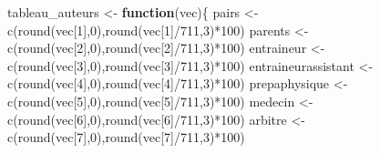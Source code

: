 \documentclass[
]{article}
\newenvironment{Shaded}{\begin{snugshade}}{\end{snugshade}}
\newcommand{\ControlFlowTok}[1]{\textcolor[rgb]{0.13,0.29,0.53}{\textbf{#1}}}
\newcommand{\DecValTok}[1]{\textcolor[rgb]{0.00,0.00,0.81}{#1}}
\newcommand{\FunctionTok}[1]{\textcolor[rgb]{0.00,0.00,0.00}{#1}}
\newcommand{\NormalTok}[1]{#1}
\newcommand{\OtherTok}[1]{\textcolor[rgb]{0.56,0.35,0.01}{#1}}
\newcommand{\SpecialCharTok}[1]{\textcolor[rgb]{0.00,0.00,0.00}{#1}}
\begin{document}
\begin{Shaded}
\begin{Highlighting}[]
\NormalTok{tableau\_auteurs }\OtherTok{\textless{}{-}} \ControlFlowTok{function}\NormalTok{(vec)\{}
\NormalTok{  pairs               }\OtherTok{\textless{}{-}} \FunctionTok{c}\NormalTok{(}\FunctionTok{round}\NormalTok{(vec[}\DecValTok{1}\NormalTok{],}\DecValTok{0}\NormalTok{),}\FunctionTok{round}\NormalTok{(vec[}\DecValTok{1}\NormalTok{]}\SpecialCharTok{/}\DecValTok{711}\NormalTok{,}\DecValTok{3}\NormalTok{)}\SpecialCharTok{*}\DecValTok{100}\NormalTok{)}
\NormalTok{  parents             }\OtherTok{\textless{}{-}} \FunctionTok{c}\NormalTok{(}\FunctionTok{round}\NormalTok{(vec[}\DecValTok{2}\NormalTok{],}\DecValTok{0}\NormalTok{),}\FunctionTok{round}\NormalTok{(vec[}\DecValTok{2}\NormalTok{]}\SpecialCharTok{/}\DecValTok{711}\NormalTok{,}\DecValTok{3}\NormalTok{)}\SpecialCharTok{*}\DecValTok{100}\NormalTok{)}
\NormalTok{  entraineur          }\OtherTok{\textless{}{-}} \FunctionTok{c}\NormalTok{(}\FunctionTok{round}\NormalTok{(vec[}\DecValTok{3}\NormalTok{],}\DecValTok{0}\NormalTok{),}\FunctionTok{round}\NormalTok{(vec[}\DecValTok{3}\NormalTok{]}\SpecialCharTok{/}\DecValTok{711}\NormalTok{,}\DecValTok{3}\NormalTok{)}\SpecialCharTok{*}\DecValTok{100}\NormalTok{)}
\NormalTok{  entraineurassistant }\OtherTok{\textless{}{-}} \FunctionTok{c}\NormalTok{(}\FunctionTok{round}\NormalTok{(vec[}\DecValTok{4}\NormalTok{],}\DecValTok{0}\NormalTok{),}\FunctionTok{round}\NormalTok{(vec[}\DecValTok{4}\NormalTok{]}\SpecialCharTok{/}\DecValTok{711}\NormalTok{,}\DecValTok{3}\NormalTok{)}\SpecialCharTok{*}\DecValTok{100}\NormalTok{)}
\NormalTok{  prepaphysique       }\OtherTok{\textless{}{-}} \FunctionTok{c}\NormalTok{(}\FunctionTok{round}\NormalTok{(vec[}\DecValTok{5}\NormalTok{],}\DecValTok{0}\NormalTok{),}\FunctionTok{round}\NormalTok{(vec[}\DecValTok{5}\NormalTok{]}\SpecialCharTok{/}\DecValTok{711}\NormalTok{,}\DecValTok{3}\NormalTok{)}\SpecialCharTok{*}\DecValTok{100}\NormalTok{)}
\NormalTok{  medecin             }\OtherTok{\textless{}{-}} \FunctionTok{c}\NormalTok{(}\FunctionTok{round}\NormalTok{(vec[}\DecValTok{6}\NormalTok{],}\DecValTok{0}\NormalTok{),}\FunctionTok{round}\NormalTok{(vec[}\DecValTok{6}\NormalTok{]}\SpecialCharTok{/}\DecValTok{711}\NormalTok{,}\DecValTok{3}\NormalTok{)}\SpecialCharTok{*}\DecValTok{100}\NormalTok{)}
\NormalTok{  arbitre             }\OtherTok{\textless{}{-}} \FunctionTok{c}\NormalTok{(}\FunctionTok{round}\NormalTok{(vec[}\DecValTok{7}\NormalTok{],}\DecValTok{0}\NormalTok{),}\FunctionTok{round}\NormalTok{(vec[}\DecValTok{7}\NormalTok{]}\SpecialCharTok{/}\DecValTok{711}\NormalTok{,}\DecValTok{3}\NormalTok{)}\SpecialCharTok{*}\DecValTok{100}\NormalTok{)}

\end{Highlighting}
\end{Shaded}
\end{document}
